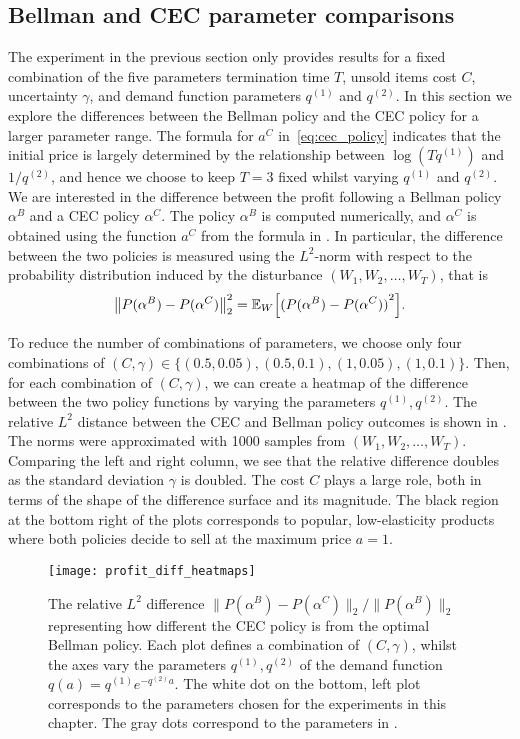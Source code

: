 \documentclass[main.tex]{subfiles}
\begin{document}
\subsection{Bellman and CEC parameter comparisons}\label{sec:parameter_comparison}
The experiment in the previous section only provides
results for a fixed combination of the five parameters
termination time $T$, unsold items cost $C$, uncertainty $\gamma$, and
demand function parameters $q^{(1)}$ and $q^{(2)}$.
In this section we explore the differences between the Bellman policy
and the CEC policy for a larger parameter range.
The formula for $a^C$ in~\eqref{eq:cec_policy} indicates that the
initial price is largely determined by the relationship between
$\log(Tq^{(1)})$ and $1/q^{(2)}$, and hence we choose to keep $T=3$ fixed whilst
varying $q^{(1)}$ and $q^{(2)}$.
We are interested in the difference between the profit following
a Bellman policy $\alpha^B$ and a CEC policy $\alpha^C$.
The policy $\alpha^B$ is computed numerically, and
$\alpha^C$ is obtained using the function $a^C$ from
the formula in .
In particular, the difference between the two policies is measured
using the $L^2$-norm with respect to the probability distribution
induced by the disturbance $(W_1,W_2,\dots,W_T)$, that is
\begin{equation}
  {\left\|P(\alpha^B)-P(\alpha^C)\right\|}_2^2
  =\mathbb{E}_W\Bigl[{( P(\alpha^B)-P(\alpha^C) )}^2 \Bigr].
\end{equation}

To reduce the number of combinations of parameters, we choose only
four combinations of
$(C,\gamma)\in\{(0.5,0.05),(0.5,0.1),(1,0.05),(1,0.1)\}$.
Then,
for each combination of $(C,\gamma)$,
we can create a heatmap of the difference between the two policy
functions by varying the parameters $q^{(1)},q^{(2)}$.
The relative $L^2$ distance between the CEC and Bellman policy outcomes
is shown in . The norms were approximated
with \num{1000} samples from $(W_1,W_2,\dots,W_T)$.
Comparing the left and right column, we see that the relative difference doubles as
the standard deviation $\gamma$ is doubled. The cost $C$ plays a large
role, both in terms of the shape of the difference surface and its
magnitude.
The black region at the bottom right of the plots corresponds to popular,
low-elasticity products where both policies decide to sell at the
maximum price $a=1$.
\begin{figure}[htbp]
  \texttt{[image: profit\_diff\_heatmaps]}
  \caption[Relative profit $L^2$ difference between the CEC and
  Bellman policies]{The relative $L^2$ difference
    $\|P(\alpha^B)-P(\alpha^C)\|_2/\|P(\alpha^B)\|_2$ representing
    how different the CEC policy is from the optimal Bellman policy.
    Each plot defines a combination of $(C,\gamma)$, whilst
    the axes vary the parameters $q^{(1)},q^{(2)}$ of the demand function
    $q(a)=q^{(1)}e^{-q^{(2)}a}$.
    The white dot on the bottom, left plot corresponds to the
    parameters chosen for the experiments in this chapter. The gray
    dots correspond to the parameters in .
  }\label{fig:profit_diff_heatmaps}
\end{figure}
\end{document}
